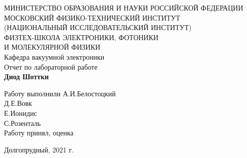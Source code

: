 \documentclass[a4paper,12pt]{article}
\begin{document}
 

\begin{titlepage}
	\begin{center}
		\large 	МИНИСТЕРСТВО ОБРАЗОВАНИЯ И НАУКИ РОССИЙСКОЙ ФЕДЕРАЦИИ\\
				МОСКОВСКИЙ ФИЗИКО-ТЕХНИЧЕСКИЙ ИНСТИТУТ \\
				(НАЦИОНАЛЬНЫЙ ИССЛЕДОВАТЕЛЬСКИЙ ИНСТИТУТ)\\ 
				ФИЗТЕХ-ШКОЛА ЭЛЕКТРОНИКИ, ФОТОНИКИ \\
				И МОЛЕКУЛЯРНОЙ ФИЗИКИ \\
		
		
		\vspace{4.0 cm}
		\LARGE{Кафедра вакуумной электроники \\ 
		Отчет по лабораторной работе} \\ 
		\LARGE \textbf{Диод Шоттки} \\
	\end{center}
	\vspace{3 cm} \large

	\begin{flushleft}
		Работу выполнили \hspace{5.5cm}  \underline{\hspace{3cm}} А.И.Белостоцкий \\	
		\hspace{9.8cm}  \underline{\hspace{3cm}} Д.Е.Вовк \\
		\hspace{9.8cm}  \underline{\hspace{3cm}} Е.Ионидис \\
		\hspace{9.8cm}  \underline{\hspace{3cm}} С.Розенталь \\
		\vspace{2cm}
		Работу принял, оценка \hspace{4.3cm} \underline{\hspace{3cm}}
	\end{flushleft}
	
	
	\vfill

	\begin{center}
	Долгопрудный, 2021 г.
	\end{center}
\end{titlepage}                                                                      

\tableofcontents
\end{document}
